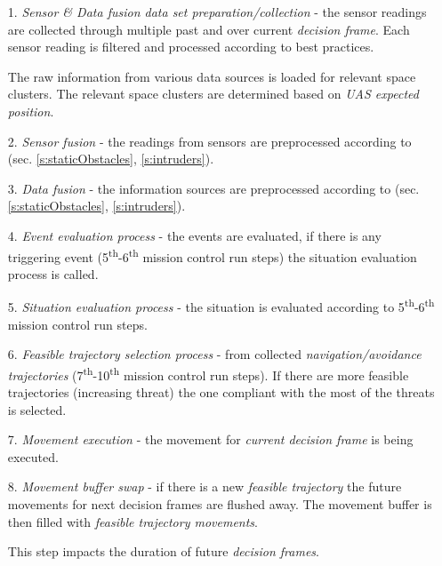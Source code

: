 \begin{itemize}
    \item[1.] \emph{Sensor \& Data fusion data set preparation/collection} - the sensor readings are collected through multiple past and over current \emph{decision frame}. Each sensor reading is filtered and processed according to best practices. 
    
    The raw information from various data sources is loaded for relevant space clusters. The relevant space clusters are determined based on \emph{UAS expected position}. 
    
    \item[2.] \emph{Sensor fusion} - the readings from sensors are preprocessed according to (sec. \ref{s:staticObstacles}, \ref{s:intruders}).
    
    \item[3.] \emph{Data fusion} - the information sources are preprocessed according to (sec. \ref{s:staticObstacles}, \ref{s:intruders}).
    
    \item[4.] \emph{Event evaluation process} - the events are evaluated, if there is any triggering event (5\textsuperscript{th}-6\textsuperscript{th} mission control run steps) the situation evaluation process is called.
    
    \item[5.] \emph{Situation evaluation process} - the situation is evaluated according to 5\textsuperscript{th}-6\textsuperscript{th} mission control run steps.
    
    \item[6.] \emph{Feasible trajectory selection process} - from collected \emph{navigation/avoidance trajectories} (7\textsuperscript{th}-10\textsuperscript{th} mission control run steps). If there are more feasible trajectories (increasing threat) the one compliant with the most of the threats is selected.
    
    \item[7.] \emph{Movement execution} - the movement for \emph{current decision frame} is being executed.
    
    \item[8.] \emph{Movement buffer swap} - if there is a new \emph{feasible trajectory} the future movements for next decision frames are flushed away. The movement buffer is then filled with \emph{feasible trajectory movements}.
    \begin{note}
        This step impacts the duration of future \emph{decision frames}.
    \end{note}
\end{itemize}
